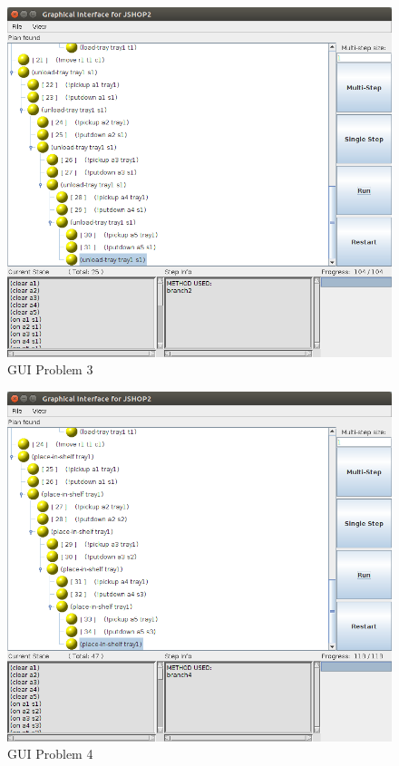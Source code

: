 \documentclass[paper=a4, fontsize=11pt]{scrartcl}
\begin{document}
	\begin{figure}
	\centering
	\includegraphics[width=1\linewidth]{images/problem3_gui}
	\caption{GUI Problem 3}
	\label{fig:problem3_gui}
	\end{figure}
	
	
	\begin{figure}
	\centering
	\includegraphics[width=1\linewidth]{images/problem4_gui}
	\caption{GUI Problem 4}
	\label{fig:problem4_gui}
	\end{figure}
	
\end{document}
